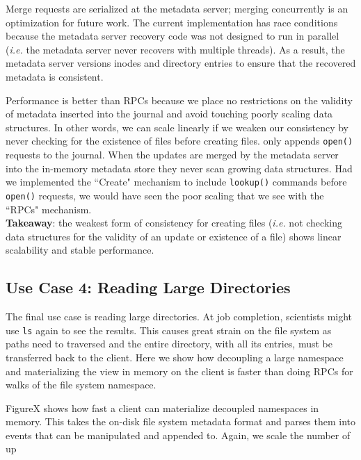 Merge requests are serialized at the metadata server; merging concurrently is
an optimization for future work. The current implementation has race conditions
because the metadata server recovery code was not designed to run in parallel
({\it i.e.} the metadata server never recovers with multiple threads). As a
result, the metadata server versions inodes and directory entries to ensure
that the recovered metadata is consistent.

Performance is better than RPCs because we place no restrictions on the
validity of metadata inserted into the journal and avoid touching poorly
scaling data structures. In other words, we can scale linearly if we weaken our
consistency by never checking for the existence of files before creating files.
only appends \texttt{open()} requests to the journal. When the updates are
merged by the metadata server into the in-memory metadata store they never scan
growing data structures.  Had we implemented the ``Create" mechanism to include
\texttt{lookup()} commands before \texttt{open()} requests, we would have seen
the poor scaling that we see with the ``RPCs" mechanism.\\

\noindent\textbf{Takeaway}: the weakest form of consistency for creating files
({\it i.e.} not checking data structures for the validity of an update or
existence of a file) shows linear scalability and stable performance.





\subsection{Use Case 4: Reading Large Directories} 

The final use case is reading large directories. At job completion, scientists
might use \texttt{ls} again to see the results. This causes great strain on the
file system as paths need to traversed and the entire directory, with all its
entries, must be transferred back to the client. Here we show how decoupling a
large namespace and materializing the view in memory on the client is faster
than doing RPCs for walks of the file system namespace.

FigureX shows how fast a client can materialize decoupled namespaces in memory.
This takes the on-disk file system metadata format and parses them into events
that can be manipulated and appended to. Again, we scale the number of up
